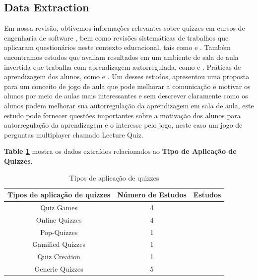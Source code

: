 \subsection{Data Extraction}

Em nossa revisão, obtivemos informações relevantes sobre quizzes em cursos de engenharia de software \cite{figueiredo_evaluation_2014}, bem como revisões sistemáticas de trabalhos que aplicaram questionários neste contexto educacional, tais como \cite{luxton-reilly_introductory_2018} e \cite {crow_intelligent_2018} . Também encontramos estudos que avaliam resultados em um ambiente de sala de aula invertida que trabalha com aprendizagem autorregulada, como \cite{ogawa_evaluation_2018} e \cite{herold_student_2012}. Práticas de aprendizagem dos alunos, como \cite{thevathayan_imparting_2017} e \cite{verdu_distributed_2012}. Um desses estudos, \cite{wu_improvement_2011} apresentou uma proposta para um conceito de jogo de aula que pode melhorar a comunicação e motivar os alunos por meio de aulas mais interessantes e sem descrever claramente como os alunos podem melhorar sua autorregulação da aprendizagem em sala de aula, este estudo pode fornecer questões importantes sobre a motivação dos alunos para autorregulação da aprendizagem  e o interesse pelo jogo, neste caso um jogo de perguntas multiplayer chamado Lecture Quiz.

\textbf{Table \ref{tab:quizzes_application_types}} mostra os dados extraídos relacionados ao \textbf{Tipo de Aplicação de Quizzes}.

\begin{table}[ht]
    \centering
        \caption{Tipos de aplicação de quizzes}
        \begin{tabular}{c|c|c}
            \hline
                \textbf{Tipos de aplicação de quizzes} & \textbf{Número de Estudos}  & \textbf{Estudos} \\
            \hline
            \hline
                Quiz Games & 
                4 &
                \cite{petri_quality_2017, petri_games_2018, verdu_distributed_2012, wu_improvement_2011} \\
            \hline
                Online Quizzes & 
                4 & 
                \cite{figueiredo_evaluation_2014, coore_facilitating_2019, luxton-reilly_introductory_2018, krugel_computational_2017} \\
            \hline
                Pop-Quizzes & 
                1 &
                \cite{luxton-reilly_introductory_2018} \\
            \hline
                Gamified Quizzes & 
                1 & 
                \cite{luxton-reilly_introductory_2018} \\
            \hline
                Quiz Creation & 
                1 & 
                \cite{ogawa_evaluation_2018} \\
            \hline
                Generic Quizzes & 
                5 & 
                \cite{crow_intelligent_2018, ogawa_evaluation_2018, acharya_infusing_2017, thevathayan_imparting_2017, herold_student_2012} \\
            \hline
        \end{tabular}
    \label{tab:quizzes_application_types}
\end{table}

